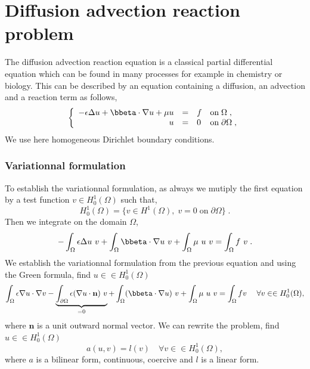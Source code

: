 %

\section{Diffusion advection reaction problem}
\label{sec:tuto-myadvection}

The diffusion advection reaction equation is a classical partial differential
equation which can be found in many processes for example in chemistry or
biology. This can be described by an equation containing a diffusion, an
advection and a reaction term as follows,
%
\begin{equation}
  \left\{
    \begin{array}{rcll}
      -\epsilon\Delta  u + \bbeta \cdot \nabla  u + \mu u & = & f & \text{on}\; \Omega \;, \\
      u  & = & 0 & \text{on}\; \partial\Omega \;, \\
    \end{array}
  \right.
  \label{eq:tuto-adv}
\end{equation}
%
We use here homogeneous Dirichlet boundary conditions.

\subsubsection{Variationnal formulation}

To establish the variationnal formulation, as always we mutiply the first equation by a
test function $v\in H_0^1(\Omega)$ such that,
\[
    H_0^1(\Omega) = \{ v\in H^1(\Omega),\; v=0 \; \text{on} \; \partial\Omega \} \;.
\]
Then we integrate on the domain $\Omega$,
%
\begin{equation}
- \int_\Omega \epsilon \Delta u\ v
+ \int_\Omega \bbeta \cdot \nabla u\ v
+ \int_\Omega \mu\ u\ v
= \int_\Omega f\ v \;.
\end{equation}
%
We establish the variationnal formulation from the previous equation and using
the Green formula, find $u \in \in H_0^1(\Omega)$
%
\begin{equation}
  \int_\Omega \epsilon \nabla u \cdot \nabla v
  - \underbrace{\int_{\partial\Omega} \epsilon (\nabla u \cdot \mathbf n)\ v}_{=0}
  + \int_\Omega (\bbeta \cdot \nabla u)\ v
  + \int_\Omega \mu\ u\ v
  = \int_\Omega f v \; \quad \forall v \in \in H_0^1(\Omega),
  \label{eq:tuto-adv-varform}
\end{equation}
%
where $\mathbf n$ is a unit outward normal vector. We can rewrite the problem,
find $u \in \in H_0^1(\Omega)$
%
\begin{equation}
    a(u,v) = l(v) \quad \forall v \in \in H_0^1(\Omega),
\label{eq:tuto-adv-bilform}
\end{equation}
%
where $a$ is a bilinear form, continuous, coercive and $l$ is a linear form.

